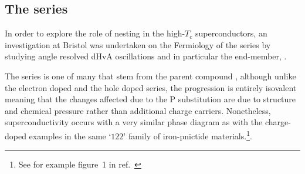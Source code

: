 
\subsection{The \BaFePAs series}

In order to explore the role of nesting in the high-$T_c$ superconductors, an investigation at Bristol was undertaken on the Fermiology of the \BaFePAs series by studying angle resolved \ac{dHvA} oscillations and in particular the end-member, \BaFeP.

The \BaFePAs series is one of many that stem from the parent compound \BaFeAs, although unlike the electron doped \BaCoFeAs and the hole doped \BaKFeAs series, the \BaFePAs progression is entirely isovalent meaning that the changes affected due to the P substitution are due to structure and chemical pressure rather than additional charge carriers. Nonetheless, superconductivity occurs with a very similar phase diagram as with the charge-doped examples in the same `$122$' family of iron-pnictide materials.\footnote{See for example figure~1 in ref.~\cite{Paglione2010}}. 

